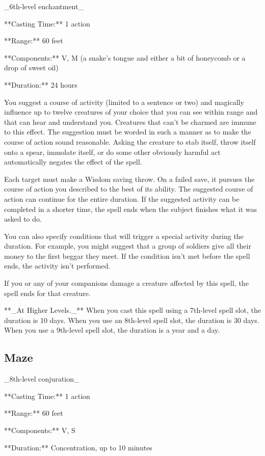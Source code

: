 _6th-level enchantment_

**Casting Time:** 1 action

**Range:** 60 feet

**Components:** V, M (a snake’s tongue and either a bit of honeycomb or a drop of sweet oil)

**Duration:** 24 hours

You suggest a course of activity (limited to a sentence or two) and magically influence up to twelve creatures of your choice that you can see within range and that can hear and understand you. Creatures that can’t be charmed are immune to this effect. The suggestion must be worded in such a manner as to make the course of action sound reasonable. Asking the creature to stab itself, throw itself onto a spear, immolate itself, or do some other obviously harmful act automatically negates the effect of the spell.

Each target must make a Wisdom saving throw. On a failed save, it pursues the course of action you described to the best of its ability. The suggested course of action can continue for the entire duration. If the suggested activity can be completed in a shorter time, the spell ends when the subject finishes what it was asked to do.

You can also specify conditions that will trigger a special activity during the duration. For example, you might suggest that a group of soldiers give all their money to the first beggar they meet. If the condition isn’t met before the spell ends, the activity isn’t performed.

If you or any of your companions damage a creature affected by this spell, the spell ends for that creature.

**_At Higher Levels._** When you cast this spell using a 7th-level spell slot, the duration is 10 days. When you use an 8th-level spell slot, the duration is 30 days. When you use a 9th-level spell slot, the duration is a year and a day.

\subsection{Maze}

_8th-level conjuration_

**Casting Time:** 1 action

**Range:** 60 feet

**Components:** V, S

**Duration:** Concentration, up to 10 minutes

